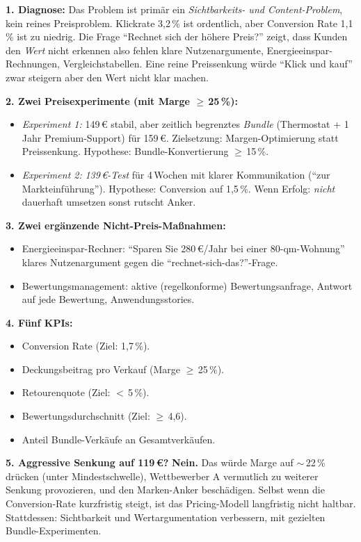 \documentclass[11pt,a4paper,oneside]{article}
\begin{document}
\begin{loesungbox}
\textbf{1. Diagnose:}
Das Problem ist primär ein \emph{Sichtbarkeits- und Content-Problem}, kein reines Preisproblem. Klickrate 3,2\,\% ist ordentlich, aber Conversion Rate 1,1\,\% ist zu niedrig. Die Frage ``Rechnet sich der höhere Preis?'' zeigt, dass Kunden den \emph{Wert} nicht erkennen \textendash{} also fehlen klare Nutzenargumente, Energieeinspar-Rechnungen, Vergleichstabellen. Eine reine Preissenkung würde ``Klick und kauf'' zwar steigern \textendash{} aber den Wert nicht klar machen.

\textbf{2. Zwei Preisexperimente (mit Marge $\geq$\,25\,\%):}
\begin{itemize}
  \item \emph{Experiment 1:} 149\,\euro{} stabil, aber zeitlich begrenztes \emph{Bundle} (Thermostat + 1\,Jahr Premium-Support) für 159\,\euro{}. Zielsetzung: Margen-Optimierung statt Preissenkung. Hypothese: Bundle-Konvertierung $\geq$\,15\,\%.
  \item \emph{Experiment 2:} \emph{139\,\euro-Test} für 4\,Wochen mit klarer Kommunikation (``zur Markteinführung''). Hypothese: Conversion auf 1,5\,\%. Wenn Erfolg: \emph{nicht} dauerhaft umsetzen \textendash{} sonst rutscht Anker.
\end{itemize}

\textbf{3. Zwei ergänzende Nicht-Preis-Maßnahmen:}
\begin{itemize}
  \item Energieeinspar-Rechner: ``Sparen Sie 280\,\euro/Jahr bei einer 80-qm-Wohnung'' \textendash{} klares Nutzenargument gegen die ``rechnet-sich-das?''-Frage.
  \item Bewertungsmanagement: aktive (regelkonforme) Bewertungsanfrage, Antwort auf jede Bewertung, Anwendungsstories.
\end{itemize}

\textbf{4. Fünf KPIs:}
\begin{itemize}
  \item Conversion Rate (Ziel: 1,7\,\%).
  \item Deckungsbeitrag pro Verkauf (Marge $\geq$\,25\,\%).
  \item Retourenquote (Ziel: $<$\,5\,\%).
  \item Bewertungsdurchschnitt (Ziel: $\geq$\,4,6).
  \item Anteil Bundle-Verkäufe an Gesamtverkäufen.
\end{itemize}

\textbf{5. Aggressive Senkung auf 119\,\euro{}?}
\textbf{Nein.} Das würde Marge auf $\sim$\,22\,\% drücken (unter Mindestschwelle), Wettbewerber A vermutlich zu weiterer Senkung provozieren, und den Marken-Anker beschädigen. Selbst wenn die Conversion-Rate kurzfristig steigt, ist das Pricing-Modell langfristig nicht haltbar. Stattdessen: Sichtbarkeit und Wertargumentation verbessern, mit gezielten Bundle-Experimenten.


\end{loesungbox}
\end{document}
